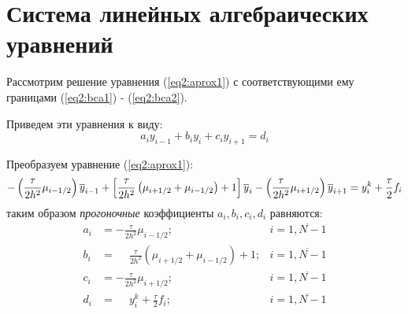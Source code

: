 \section{Система линейных алгебраических уравнений} \label{sec:sole}

Рассмотрим решение уравнения (\ref{eq2:aprox1}) с соответствующими ему границами (\ref{eq2:bca1}) - (\ref{eq2:bca2}). 

Приведем эти уравнения к виду:
\begin{equation}
     a_i y_{i-1} + b_i y_{i} +  c_i y_{i+1} = d_i
\end{equation}

Преобразуем уравнение (\ref{eq2:aprox1}):
\begin{equation*}
    \label{eq2:fixedaprox1}
    -\left(\frac{\tau}{2h^2}\mu_{i-1/2}\right) \overline{y}_{i-1} + \left[\frac{\tau}{2h^2}\left(\mu_{i+1/2} + \mu_{i-1/2}\right) + 1\right]\overline{y}_{i} - \left(\frac{\tau}{2h^2}\mu_{i+1/2}\right) \overline{y}_{i+1} = y^{k}_{i} +  \frac{\tau}{2} f_{i}\\
\end{equation*}
таким образом \textit{прогоночные} коэффициенты $a_i, b_i, c_i, d_i$ равняются:
\begin{equation}
    \label{eq2:coefficient1}
    \begin{aligned}
        a_{i} &= -\frac{\tau}{2h^2}\mu_{i-1/2}; & i = \overline{1,N-1} \\
        b_{i} &= \phantom{-}\frac{\tau}{2h^2}\left(\mu_{i+1/2} + \mu_{i-1/2}\right) + 1; & i = \overline{1,N-1} \\
        c_{i} &= -\frac{\tau}{2h^2}\mu_{i+1/2}; & i = \overline{1,N-1} \\
        d_{i} &= \phantom{-}y^{k}_{i} +  \frac{\tau}{2} f_{i}; & i = \overline{1,N-1}
    \end{aligned}
\end{equation}

